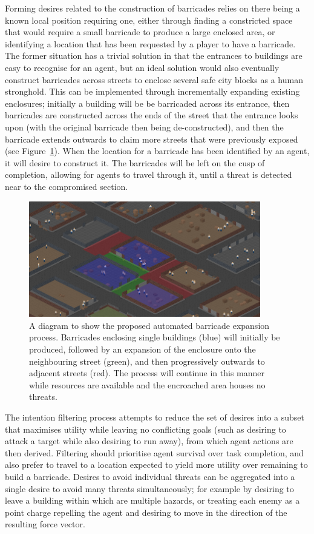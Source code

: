 \documentclass[12pt,a4paper]{article}
\begin{document}
Forming desires related to the construction of barricades relies on there being a known local position requiring one, either through finding a constricted space that would require a small barricade to produce a large enclosed area, or identifying a location that has been requested by a player to have a barricade. The former situation has a trivial solution in that the entrances to buildings are easy to recognise for an agent, but an ideal solution would also eventually construct barricades across streets to enclose several safe city blocks as a human stronghold. This can be implemented through incrementally expanding existing enclosures; initially a building will be be barricaded across its entrance, then barricades are constructed across the ends of the street that the entrance looks upon (with the original barricade then being de-constructed), and then the barricade extends outwards to claim more streets that were previously exposed (see Figure~\ref{fig:barricades}). When the location for a barricade has been identified by an agent, it will desire to construct it. The barricades will be left on the cusp of completion, allowing for agents to travel through it, until a threat is detected near to the compromised section.

\begin{figure}[h]
\centering
\includegraphics[width=0.9\textwidth]{barricades}
\caption{A diagram to show the proposed automated barricade expansion process. Barricades enclosing single buildings (blue) will initially be produced, followed by an expansion of the enclosure onto the neighbouring street (green), and then progressively outwards to adjacent streets (red). The process will continue in this manner while resources are available and the encroached area houses no threats.}
\label{fig:barricades}
\end{figure}

The intention filtering process attempts to reduce the set of desires into a subset that maximises utility while leaving no conflicting goals (such as desiring to attack a target while also desiring to run away), from which agent actions are then derived. Filtering should prioritise agent survival over task completion, and also prefer to travel to a location expected to yield more utility over remaining to build a barricade. Desires to avoid individual threats can be aggregated into a single desire to avoid many threats simultaneously; for example by desiring to leave a building within which are multiple hazards, or treating each enemy as a point charge repelling the agent and desiring to move in the direction of the resulting force vector.
\end{document}
